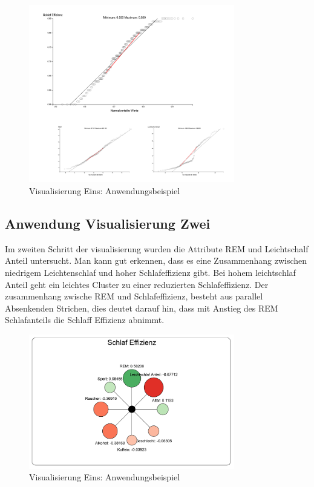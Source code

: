 \documentclass[usegeometry=true]{scrartcl}
\begin{document}
\begin{figure}[h]
  \centering
  \includegraphics[width = 0.8\textwidth]{Bsp_QQ-Plot.JPG}
  \caption{Visualisierung Eins: Anwendungsbeispiel}
\end{figure}

\subsection{Anwendung Visualisierung Zwei}

Im zweiten Schritt der visualisierung wurden die Attribute REM und Leichtschalf Anteil untersucht. Man kann gut erkennen, dass es eine Zusammenhang zwischen niedrigem Leichtenschlaf und hoher Schlafeffizienz gibt. Bei hohem leichtschlaf Anteil geht ein leichtes Cluster zu einer reduzierten Schlafeffizienz. 
Der zusammenhang zwische REM und Schlafeffizienz, besteht aus parallel Absenkenden Strichen, dies deutet darauf hin, dass mit Anstieg des REM Schlafanteils die Schlaff Effizienz abnimmt.

\begin{figure}[h]

  \centering
  \includegraphics [width = 0.8\textwidth]{Bsp_ImpactGraph.JPG}
  \caption{Visualisierung Eins: Anwendungsbeispiel}

  
\end{figure}
\end{document}
